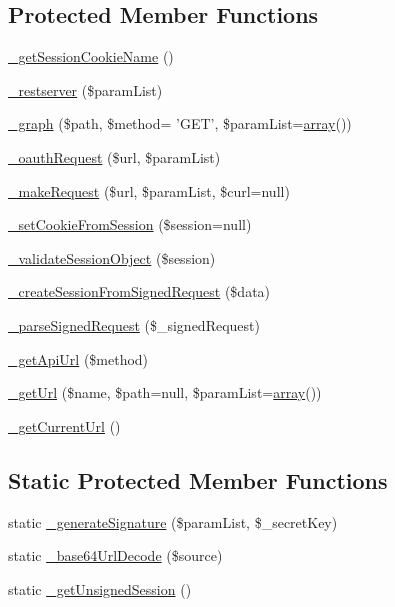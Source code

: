 \subsection*{Protected Member Functions}
\begin{DoxyCompactItemize}
\item 
\hyperlink{classCPSFacebook_a69c13b5e61215433a48b9a6742f16660}{\_\-getSessionCookieName} ()
\item 
\hyperlink{classCPSFacebook_a896336f5000bed98a0e59b3b38b8b8e1}{\_\-restserver} (\$paramList)
\item 
\hyperlink{classCPSFacebook_a3fc1ae91766eca08b5a6fc48a6c6ebe2}{\_\-graph} (\$path, \$method= 'GET', \$paramList=\hyperlink{list_8php_aa3205d038c7f8feb5c9f01ac4dfadc88}{array}())
\item 
\hyperlink{classCPSFacebook_a0519e81c281afecdca2d58dd75d164f0}{\_\-oauthRequest} (\$url, \$paramList)
\item 
\hyperlink{classCPSFacebook_ae101534735ff109fc2b6ce694033e42e}{\_\-makeRequest} (\$url, \$paramList, \$curl=null)
\item 
\hyperlink{classCPSFacebook_a818b7c88630a9f0a6318aecb55160c38}{\_\-setCookieFromSession} (\$session=null)
\item 
\hyperlink{classCPSFacebook_a7dd3fb0ddff204e195f91b8719104a61}{\_\-validateSessionObject} (\$session)
\item 
\hyperlink{classCPSFacebook_ad095f729036d48a23d321839f3ea7853}{\_\-createSessionFromSignedRequest} (\$data)
\item 
\hyperlink{classCPSFacebook_a2b963de2da5e5d03684f94c360f948ea}{\_\-parseSignedRequest} (\$\_\-signedRequest)
\item 
\hyperlink{classCPSFacebook_a0e0a4234900c6b099259f0fc0ab65a67}{\_\-getApiUrl} (\$method)
\item 
\hyperlink{classCPSFacebook_a719203fb2a7e839997705e75e0bcc9a1}{\_\-getUrl} (\$name, \$path=null, \$paramList=\hyperlink{list_8php_aa3205d038c7f8feb5c9f01ac4dfadc88}{array}())
\item 
\hyperlink{classCPSFacebook_a1d2b68391ad44fe79ecef5ecd09feec3}{\_\-getCurrentUrl} ()
\end{DoxyCompactItemize}
\subsection*{Static Protected Member Functions}
\begin{DoxyCompactItemize}
\item 
static \hyperlink{classCPSFacebook_a9a1bb3c0a4009df8453e84cb39506723}{\_\-generateSignature} (\$paramList, \$\_\-secretKey)
\item 
static \hyperlink{classCPSFacebook_a7cc54c00b8b799176e515bd2d26a6868}{\_\-base64UrlDecode} (\$source)
\item 
static \hyperlink{classCPSFacebook_ad8d438fe02fb781abe815fd5972795ff}{\_\-getUnsignedSession} ()
\end{DoxyCompactItemize}
